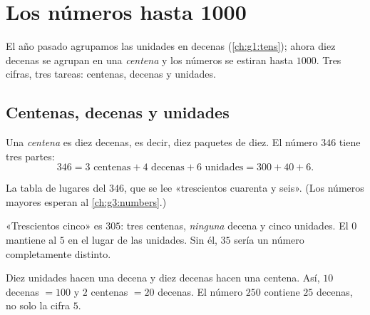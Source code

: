 \chapter{Los números hasta 1000}\label{ch:g2:numbers}

El año pasado agrupamos las unidades en decenas (\cref{ch:g1:tens}); ahora diez
decenas se agrupan en una \emph{centena} y los números se estiran hasta
$1000$. Tres cifras, tres tareas: centenas, decenas y unidades.

\section{Centenas, decenas y unidades}

\begin{definition}\label{def:g2:numbers:places}
Una \emph{centena} es diez decenas, es decir, diez paquetes de diez. El
número $346$ tiene tres partes:
\[
346 = 3 \text{ centenas} + 4 \text{ decenas} + 6 \text{ unidades}
= 300 + 40 + 6 .
\]
\end{definition}

\begin{omfigure}

{\small La tabla de lugares del $346$, que se lee «trescientos cuarenta y seis».
(Los números mayores esperan al \cref{ch:g3:numbers}.)}
\end{omfigure}

\begin{example}\label{ex:g2:numbers:zero}
«Trescientos cinco» es $305$: tres centenas, \emph{ninguna}
decena y cinco unidades. El $0$ mantiene al $5$ en el lugar de las unidades. Sin
él, $35$ sería un número completamente distinto.
\end{example}

\begin{example}[Cambiar]\label{ex:g2:numbers:exchange}
Diez unidades hacen una decena y diez decenas hacen una centena. Así, $10$ decenas
$= 100$ y $2$ centenas $= 20$ decenas. El número $250$ contiene
$25$ decenas, no solo la cifra $5$.
\end{example}

